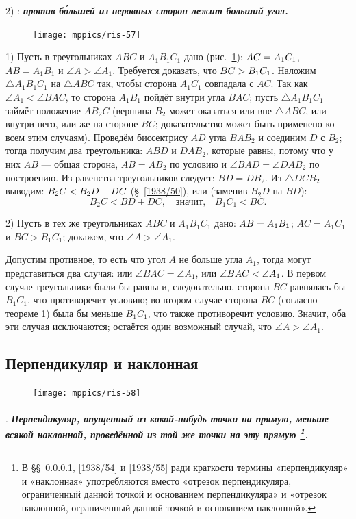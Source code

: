 2) :
\textbf{\emph{против б\'{о}льшей из неравных сторон лежит больший угол.}}

\begin{figure}[h!]
\centering
\texttt{[image: mppics/ris-57]}
\caption{}\label{1938/ris-57}
\end{figure}

1) Пусть в треугольниках $ABC$ и $A_1B_1C_1$ дано (рис.~\ref{1938/ris-57}):
$AC\z=A_1C_1$, $AB=A_1B_1$ и $\angle A > \angle A_1$.
Требуется доказать, что $BC\z>B_1C_1$.
Наложим $\triangle A_1B_1C_1$ на $\triangle ABC$ так, чтобы сторона $A_1C_1$ совпадала с $AC$.
Так как $\angle A_1 < \angle BAC$, то сторона $A_1B_1$ пойдёт внутри угла $BAC$;
пусть $\triangle A_1B_1C_1$ займёт положение $AB_2C$ (вершина $B_2$ может оказаться или вне $\triangle ABC$, или внутри него, или же на стороне $BC$;
доказательство может быть применено ко всем этим случаям).
Проведём биссектрису $AD$ угла $BAB_2$ и соединим $D$ с $B_2$;
тогда получим два треугольника:
$ABD$ и $DAB_2$, которые равны, потому что у них $AB$ — общая сторона, $AB=AB_2$ по условию и $\angle BAD=\angle DAB_2$ по построению.
Из равенства треугольников следует:
$BD=DB_2$.
Из $\triangle DCB_2$ выводим:
$B_2C < B_2D \z+ DC$ (§~\ref{1938/50}), или (заменив $B_2D$ на $BD$):
\[B_2C <BD +DC,\quad\text{значит,}\quad B_1C_1 < BC.\]

2) Пусть в тех же треугольниках $ABC$ и $A_1B_1C_1$ дано:
$AB\z=A_1B_1$;
$AC=A_1C_1$ и $BC>B_1C_1$;
докажем, что $\angle A > \angle A_1$.

Допустим противное, то есть что угол $A$ не больше угла $A_1$, тогда могут представиться два случая:
или $\angle BAC = \angle A_1$, или $\angle BAC \z< \angle A_1$.
В первом случае треугольники были бы равны и, следовательно, сторона $BC$ равнялась бы $B_1C_1$, что противоречит условию;
во втором случае сторона $BC$ (согласно теореме 1) была бы меньше $B_1C_1$, что также противоречит условию.
Значит, оба эти случая исключаются;
остаётся один возможный случай, что $\angle A > \angle A_1$.


\subsection*{Перпендикуляр и наклонная}

\begin{figure}
\vskip -5mm
\centering
\texttt{[image: mppics/ris-58]}
\caption{}\label{1938/ris-58}
\end{figure}

\paragraph{}\label{1938/53}
\mbox{.}
\textbf{\emph{Перпендикуляр, опущенный из какой-нибудь точки на прямую, меньше всякой наклонной, проведённой из той же точки на эту прямую%
\footnote{В §§~\ref{1938/53}, \ref{1938/54} и \ref{1938/55} ради краткости термины «перпендикуляр» и «наклонная» употребляются вместо «отрезок перпендикуляра, ограниченный данной точкой и основанием перпендикуляра» и «отрезок наклонной, ограниченный данной точкой и основанием наклонной».}.%
}}

